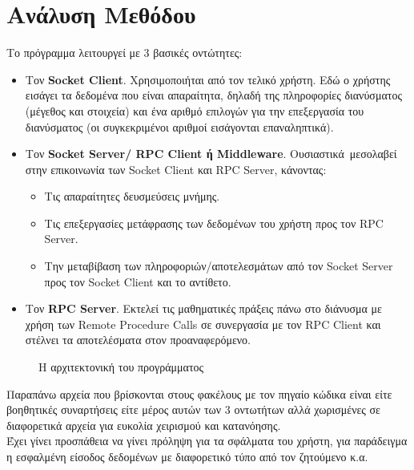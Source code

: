 \section{Ανάλυση Μεθόδου}
Το πρόγραμμα λειτουργεί με 3 βασικές οντώτητες:
\begin{itemize}
    \item Τον \textbf{Socket Client}. Χρησιμοποιήται από τον τελικό
        χρήστη. Εδώ ο χρήστης εισάγει τα δεδομένα που είναι απαραίτητα, δηλαδή
        της πληροφορίες διανύσματος (μέγεθος και στοιχεία) και ένα αριθμό
        επιλογών για την επεξεργασία του διανύσματος (οι συγκεκριμένοι αριθμοί
        εισάγονται επαναληπτικά).
    \item Τον \textbf{Socket Server/ RPC Client ή Middleware}. Ουσιαστικά\
        μεσολαβεί στην επικοινωνία των Socket Client και RPC Server, κάνοντας:
\begin{itemize}
        \item Τις απαραίτητες δευσμεύσεις μνήμης.
        \item Τις επεξεργασίες μετάφρασης των δεδομένων του χρήστη προς τον
            RPC Server.
        \item Την μεταβίβαση των πληροφοριών/αποτελεσμάτων από τον Socket
            Server προς τον Socket Client και το αντίθετο.
\end{itemize}
    \item Τον \textbf{RPC Server}. Εκτελεί τις μαθηματικές πράξεις πάνω στο
        διάνυσμα με χρήση των Remote Procedure Calls σε συνεργασία με τον
        RPC Client και στέλνει τα αποτελέσματα στον προαναφερόμενο.
\end{itemize}
\begin{figure}[ht]
    \centering
    \caption{\footnotesize{Η αρχιτεκτονική του προγράμματος}}
    \label{fig:searx-oper}
\end{figure}
Παραπάνω αρχεία που βρίσκονται στους φακέλους με τον πηγαίο κώδικα είναι
είτε βοηθητικές συναρτήσεις είτε μέρος αυτών των 3 οντωτήτων αλλά χωρισμένες
σε διαφορετικά αρχεία για ευκολία χειρισμού και κατανόησης.
\\
Έχει γίνει προσπάθεια να γίνει πρόληψη για τα σφάλματα του χρήστη, για
παράδειγμα η εσφαλμένη είσοδος δεδομένων με διαφορετικό τύπο από τον ζητούμενο
κ.α.
